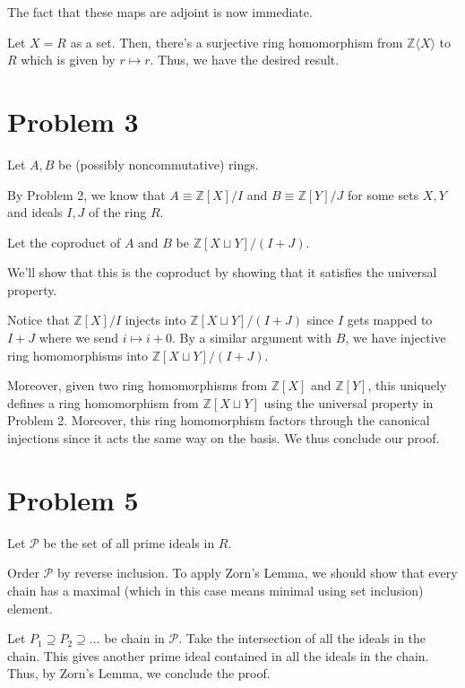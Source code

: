 \documentclass{article}
\theoremstyle{definition}
\begin{document}
The fact that these maps are adjoint is now immediate.

Let $ X = R $ as a set. Then, there's a surjective
ring homomorphism from $ \mathbb{Z} \langle X \rangle $ to $ R $
which is given by $ r \mapsto r $. Thus, we have the desired result.

\section{Problem 3}

Let $ A,B $ be (possibly noncommutative) rings.

By Problem 2, we know that $ A \equiv \mathbb{Z}[X] / I $ and  
$ B \equiv \mathbb{Z}[Y] / J $ for some sets $ X,Y $ and ideals $ I,J $
of the ring $ R $.

Let the coproduct of $ A $ and $ B $ be $ \mathbb{Z}[X \sqcup Y ]/ (I + J) $.

We'll show that this is the coproduct by showing that it satisfies the universal property.

Notice that $ \mathbb{Z}[X] / I $ injects into $ \mathbb{Z}[X \sqcup Y]/ (I + J) $
since $ I $ gets mapped to $ I + J $ where we send $ i \mapsto i + 0 $. By a similar argument with $ B $,
we have injective ring homomorphisms into $ \mathbb{Z}[X \sqcup Y ]/ (I + J) $.

Moreover, given two ring homomorphisms from $ \mathbb{Z}[X] $ and $ \mathbb{Z}[Y] $,
this uniquely defines a ring homomorphism from $ \mathbb{Z}[X \sqcup Y] $ using the universal
property in Problem 2. Moreover, this ring homomorphism factors through the canonical injections
since it acts the same way on the basis. We thus conclude our proof.

\section{Problem 5}

Let $ \mathcal{P} $ be the set of all prime ideals in $ R $.

Order $ \mathcal{P} $ by reverse inclusion. To apply Zorn's Lemma, we should show
that every chain has a maximal (which in this case means minimal using set inclusion)
element.

Let $ P_{1} \supseteq P_{2} \supseteq \ldots $ be chain in $ \mathcal{P} $.
Take the intersection of all the ideals in the chain.
This gives another prime ideal contained in all the ideals in the chain.
Thus, by Zorn's Lemma, we conclude the proof.
\end{document}
